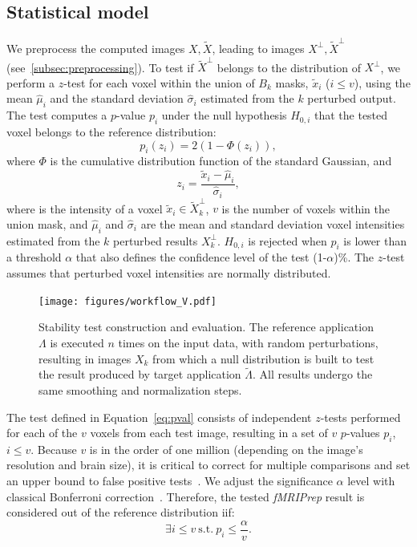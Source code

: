 \documentclass[lettersize,journal]{IEEEtran}
\newcommand{\fmriprep}{\emph{fMRIPrep}\xspace}
\newcommand{\add}[1]{{#1}} %
\begin{document}
\subsection{Statistical model}
\label{subsec:statistical_model}

We preprocess the computed images $X,\tilde X$, leading to images $X^\perp,
  \tilde X^\perp$ (see~\ref{subsec:preprocessing}). To test if $\tilde X^\perp$
belongs to the distribution of $X^\perp$, we perform a $z$-test for each voxel
within the union of $B_k$ masks, $\tilde x_i$ ($i\leq v$), using the mean $\hat
  \mu_i$ and the standard deviation $\hat \sigma_i$ estimated from the $k$
perturbed output. The test computes a $p$-value $p_i$ under the null hypothesis
$H_{0,i}$ that the tested voxel belongs to the reference distribution:
\begin{equation} \label{eq:pval}
  p_i(z_i) = 2 \left(1-\Phi(z_i)\right),
\end{equation}
where $\Phi$ is the cumulative distribution function of the \add{standard} Gaussian, and
\begin{equation*}
  z_i = \frac{\tilde x_i-\hat \mu_i}{\hat \sigma_i},
\end{equation*}
where is the intensity of a voxel $\tilde x_i \in \tilde X_k^\perp$, $v$ is the number of voxels within the union mask,
and $\hat \mu_i$ and $\hat \sigma_i$ are the mean and standard deviation voxel intensities estimated
from the $k$ perturbed results $X_k^\perp$.
$H_{0,i}$ is rejected when $p_i$ is lower than a threshold $\alpha$ that also defines the confidence level of the test (1-$\alpha$)\%.
The $z$-test assumes that perturbed voxel intensities are normally distributed.

\begin{figure}
  \centering
  \texttt{[image: figures/workflow\_V.pdf]}
  \caption{Stability test construction and evaluation. The reference application $\Lambda$ is executed $n$ times on the input data, with random perturbations, resulting in images $X_k$ from which a null distribution is built to test the result produced by target application $\tilde \Lambda$. All results undergo the same smoothing and normalization steps.}
  \label{fig:test_workflow}
\end{figure}

The test defined in Equation~\ref{eq:pval} consists of independent $z$-tests
performed for each of the $v$ voxels from each test image, resulting in a set
of $v$ $p$-values $p_i$, $i \leq v$. Because $v$ is in the order of one million
(depending on the image's resolution and brain size), it is critical to correct
for multiple comparisons and set an upper bound to false positive
tests~\cite{NICHOLS2007246}. We adjust the significance $\alpha$ level with
classical Bonferroni correction~\cite{farcomeni2008review}. Therefore, the
tested \fmriprep result is considered out of the reference distribution iif:
\begin{equation}
  \label{eq:bonferroni}
  \exists i \leq v \ \text{s.t.} \ p_i \leq \frac{\alpha}{v}.
\end{equation}
\end{document}
